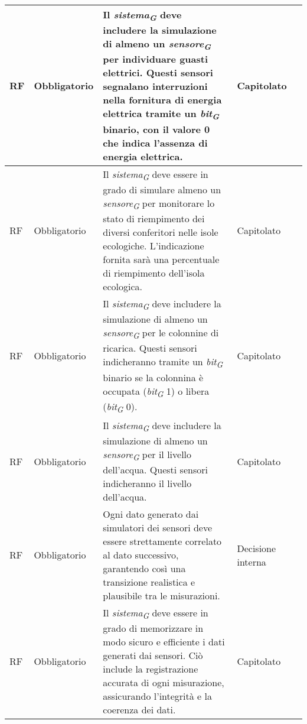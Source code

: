 \begin{longtable}{|C{1.5cm}|C{2cm}|L{5cm}|C{2cm}|C{1.5cm}|}
    \hline
     RF & Obbligatorio &  Il \textit{sistema}\textsubscript{\textit{G}} deve includere la simulazione di almeno un \textit{sensore}\textsubscript{\textit{G}} per individuare guasti elettrici. Questi sensori segnalano interruzioni nella fornitura di energia elettrica tramite un \textit{bit}\textsubscript{\textit{G}} binario, con il valore 0 che indica l'assenza di energia elettrica.& Capitolato & \\
    
    \hline
     RF & Obbligatorio &  Il \textit{sistema}\textsubscript{\textit{G}} deve essere in grado di simulare almeno un \textit{sensore}\textsubscript{\textit{G}} per monitorare lo stato di riempimento dei diversi conferitori nelle isole ecologiche. L'indicazione fornita sarà una percentuale di riempimento dell'isola ecologica. & Capitolato & \\
    
    \hline
     RF & Obbligatorio & Il \textit{sistema}\textsubscript{\textit{G}} deve includere la simulazione di almeno un \textit{sensore}\textsubscript{\textit{G}} per le colonnine di ricarica. Questi sensori indicheranno tramite un \textit{bit}\textsubscript{\textit{G}} binario se la colonnina è occupata (\textit{bit}\textsubscript{\textit{G}} 1) o libera (\textit{bit}\textsubscript{\textit{G}} 0).& Capitolato & \\
    
    \hline
     RF & Obbligatorio & Il \textit{sistema}\textsubscript{\textit{G}} deve includere la simulazione di almeno un \textit{sensore}\textsubscript{\textit{G}} per il livello dell'acqua. Questi sensori indicheranno il livello dell'acqua.& Capitolato &  \\
    
    \hline
     RF & Obbligatorio &  Ogni dato generato dai simulatori dei sensori deve essere strettamente correlato al dato successivo, garantendo così una transizione realistica e plausibile tra le misurazioni.& Decisione interna & \\
    
    \hline
     RF & Obbligatorio & Il \textit{sistema}\textsubscript{\textit{G}} deve essere in grado di memorizzare in modo sicuro e efficiente i dati generati dai sensori. Ciò include la registrazione accurata di ogni misurazione, assicurando l'integrità e la coerenza dei dati.& Capitolato & \\
    

\end{longtable}

